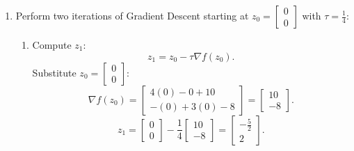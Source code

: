 \documentclass[12pt]{article}
\begin{document}
\begin{enumerate}
\begin{enumerate}
    \item Perform two iterations of Gradient Descent starting at \( z_0 = \begin{bmatrix} 0 \\ 0 \end{bmatrix} \) with \( \tau = \frac{1}{4} \):
    \begin{enumerate}
        \item Compute \( z_1 \):
        \[
        z_1 = z_0 - \tau \nabla f(z_0).
        \]
        Substitute \( z_0 = \begin{bmatrix} 0 \\ 0 \end{bmatrix} \):
        \[
        \nabla f(z_0) = \begin{bmatrix} 4(0) - 0 + 10 \\ -(0) + 3(0) - 8 \end{bmatrix} = \begin{bmatrix} 10 \\ -8 \end{bmatrix}.
        \]
        \[
        z_1 = \begin{bmatrix} 0 \\ 0 \end{bmatrix} - \frac{1}{4} \begin{bmatrix} 10 \\ -8 \end{bmatrix} = \begin{bmatrix} -\frac{5}{2} \\ 2 \end{bmatrix}.
        \]


\end{enumerate}
\end{enumerate}
\end{enumerate}
\end{document}
